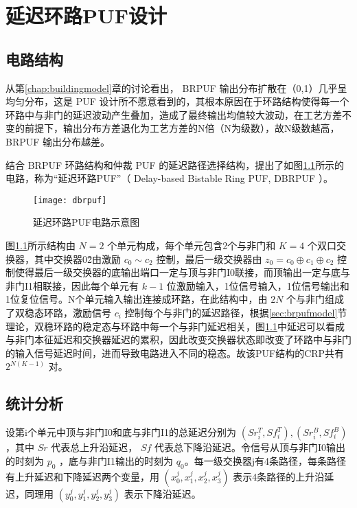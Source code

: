 
\chapter{延迟环路PUF设计}\label{chap:dbrpuf}

\section{电路结构}\label{sec:dbrpuf_scheme}
从第\ref{chap:buildingmodel}章的讨论看出， BRPUF 输出分布扩散在（0,1）几乎呈均匀分布，这是 PUF 设计所不愿意看到的，其根本原因在于环路结构使得每一个环路中与非门的延迟波动产生叠加，造成了最终输出均值较大波动，在工艺方差不变的前提下，输出分布方差退化为工艺方差的N倍（N为级数），故N级数越高， BRPUF 输出分布越差。

结合 BRPUF 环路结构和仲裁 PUF 的延迟路径选择结构，提出了如图\ref{fig:dbrpuf}所示的电路，称为``延迟环路PUF''（ Delay-based Bistable Ring PUF, DBRPUF ）。

\begin{figure}[htb]
\centering
\texttt{[image: dbrpuf]}
\caption{延迟环路PUF电路示意图}
\label{fig:dbrpuf}
\end{figure}

图\ref{fig:dbrpuf}所示结构由 $ N=2 $ 个单元构成，每个单元包含2个与非门和 $ K=4 $ 个双口交换器，其中交换器0\~2由激励 $ c_0\sim c_2 $ 控制，最后一级交换器由 $ z_0=c_0\oplus c_1\oplus c_2  $ 控制使得最后一级交换器的底输出端口一定与顶与非门I0联接，而顶输出一定与底与非门I1相联接，因此每个单元有 $ k-1 $ 位激励输入，1位信号输入，1位信号输出和1位复位信号。N个单元输入输出连接成环路，在此结构中，由 $ 2N $ 个与非门组成了双稳态环路，激励信号 $ c_i $ 控制每个与非门的延迟路径，根据\ref{sec:brpufmodel}节理论，双稳环路的稳定态与环路中每一个与非门延迟相关，图\ref{fig:dbrpuf}中延迟可以看成与非门本征延迟和交换器延迟的累积，因此改变交换器状态即改变了环路中与非门的输入信号延迟时间，进而导致电路进入不同的稳态。故该PUF结构的CRP共有 $ 2^{N(K-1)} $ 对。

\section{统计分析}\label{sec:dbrpuf_stat}
设第i个单元中顶与非门I0和底与非门I1的总延迟分别为 $ (Sr_i^T,Sf_i^T),(Sr_i^B,Sf_i^B) $，其中 $ Sr $ 代表总上升沿延迟， $ Sf $ 代表总下降沿延迟。令信号从顶与非门I0输出的时刻为 $ p_0 $ ，底与非门I1输出的时刻为 $ q_0 $。每一级交换器j有4条路径，每条路径有上升延迟和下降延迟两个变量，用 $ (x_0^j,x_1^j,x_2^j,x_3^j) $ 表示4条路径的上升沿延迟，同理用 $ (y_0^j,y_1^j,y_2^j,y_3^j) $ 表示下降沿延迟。

